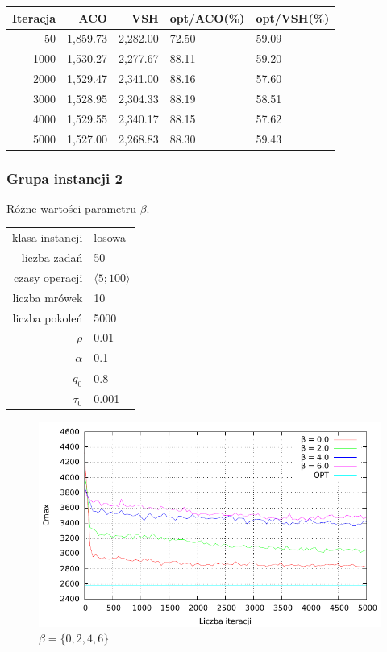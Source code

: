 \documentclass[10pt,a4paper]{article}
\begin{document}
\begin{tabular}{rrrll}
Iteracja & ACO & VSH  & opt/ACO(\%) & opt/VSH(\%) \\
\midrule
50	& 1,859.73	& 2,282.00	& 72.50 &	59.09\\
1000	& 1,530.27	& 2,277.67	& 88.11 &	59.20\\
2000	& 1,529.47	& 2,341.00 &	88.16 &	57.60\\
3000	& 1,528.95	& 2,304.33 &	88.19 &	58.51\\
4000	& 1,529.55	& 2,340.17 &	88.15 &	57.62\\
5000	& 1,527.00	& 2,268.83 & 88.30 &	59.43\\

\bottomrule
\end{tabular}

\newpage
\subsubsection{Grupa instancji 2}
Różne wartości parametru $\beta$.

\begin{center}
\begin{tabular}{|r|l|}
  \hline
  klasa instancji & losowa \\
  liczba zadań & 50 \\
  czasy operacji & $ \langle 5;100 \rangle $  \\
  liczba mrówek & 10 \\
  liczba pokoleń & 5000 \\
  $ \rho $ & 0.01 \\
  $ \alpha $ & 0.1 \\
  $ q_0 $ & 0.8 \\
  $ \tau_0 $ & 0.001 \\
  \hline
\end{tabular}
\end{center}

\begin{figure}[h]
    \centering
    \includegraphics{./figures/inst01_rnd_beta_smooth.pdf}
    \caption{$ \beta = \{ 0, 2, 4, 6 \} $}
\end{figure}
\end{document}
